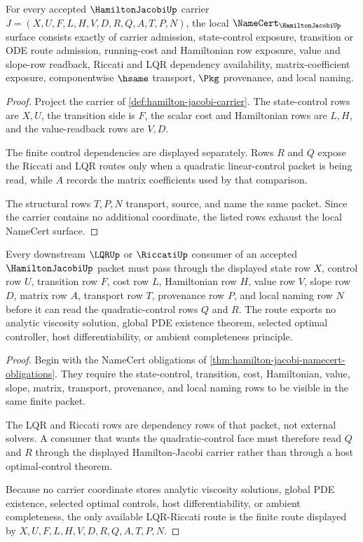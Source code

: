 \begin{theorem}
\label{thm:hamilton-jacobi-namecert-obligations}
For every accepted $\HamiltonJacobiUp$ carrier $J=(X,U,F,L,H,V,D,R,Q,A,T,P,N)$, the local $\NameCert_{\HamiltonJacobiUp}$ surface consists exactly of carrier admission, state-control exposure, transition or ODE route admission, running-cost and Hamiltonian row exposure, value and slope-row readback, Riccati and LQR dependency availability, matrix-coefficient exposure, componentwise $\hsame$ transport, $\Pkg$ provenance, and local naming.
\end{theorem}
\begin{proof}
Project the carrier of \autoref{def:hamilton-jacobi-carrier}. The state-control rows are $X,U$, the transition side is $F$, the scalar cost and Hamiltonian rows are $L,H$, and the value-readback rows are $V,D$.

The finite control dependencies are displayed separately. Rows $R$ and $Q$ expose the Riccati and LQR routes only when a quadratic linear-control packet is being read, while $A$ records the matrix coefficients used by that comparison.

The structural rows $T,P,N$ transport, source, and name the same packet. Since the carrier contains no additional coordinate, the listed rows exhaust the local NameCert surface.
\end{proof}

\begin{theorem}
\label{thm:hamilton-jacobi-lqr-riccati-route}
Every downstream $\LQRUp$ or $\RiccatiUp$ consumer of an accepted $\HamiltonJacobiUp$ packet must pass through the displayed state row $X$, control row $U$, transition row $F$, cost row $L$, Hamiltonian row $H$, value row $V$, slope row $D$, matrix row $A$, transport row $T$, provenance row $P$, and local naming row $N$ before it can read the quadratic-control rows $Q$ and $R$. The route exports no analytic viscosity solution, global PDE existence theorem, selected optimal controller, host differentiability, or ambient completeness principle.
\end{theorem}
\begin{proof}
Begin with the NameCert obligations of \autoref{thm:hamilton-jacobi-namecert-obligations}. They require the state-control, transition, cost, Hamiltonian, value, slope, matrix, transport, provenance, and local naming rows to be visible in the same finite packet.

The LQR and Riccati rows are dependency rows of that packet, not external solvers. A consumer that wants the quadratic-control face must therefore read $Q$ and $R$ through the displayed Hamilton-Jacobi carrier rather than through a host optimal-control theorem.

Because no carrier coordinate stores analytic viscosity solutions, global PDE existence, selected optimal controls, host differentiability, or ambient completeness, the only available LQR-Riccati route is the finite route displayed by $X,U,F,L,H,V,D,R,Q,A,T,P,N$.
\end{proof}

